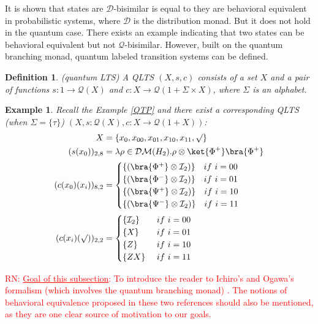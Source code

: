 \documentclass[a4paper, 11pt]{article}
\newtheorem{definition}{Definition}
\newtheorem{example}{Example}
\newcommand{\nevComment}[1]{\textcolor{red}{RN: #1}}
\begin{document}
It is shown that states are $\mathcal{D}$-bisimilar is equal to they are behavioral equivalent in probabilistic systems, where $\mathcal{D}$ is the distribution monad. But it does not hold in the quantum case. There exists an example indicating that two states can be behavioral equivalent but not $\mathcal{Q}$-bisimilar. However, built on the quantum branching monad, quantum labeled transition systems can be defined.  

\begin{definition}(quantum LTS) A QLTS $(X,s,c)$ consists of a set $X$ and a pair of functions $s:1\rightarrow \mathcal{Q}(X)$ and $c:X\rightarrow\mathcal{Q}(1+\Sigma\times X)$, where $\Sigma$ is an alphabet. 
\end{definition}

\begin{example}
Recall the Example \ref{QTP} and there exist a corresponding QLTS (when $\Sigma=\{\tau\}$) $(X,s:\mathcal{Q}(X),c:X\rightarrow \mathcal{Q}(1+X))$:
$$
\begin{aligned}
X&=\{x_0,x_{00},x_{01},x_{10},x_{11},\surd\}\\
(s(x_0))_{2,8}&=\lambda\rho\in\mathcal{DM}(H_2).\rho\otimes\ket{\Phi^+}\bra{\Phi^+}\\
(c(x_0)(x_i))_{8,2}&=
\begin{cases}
\{(\bra{\Phi^+}\otimes\mathcal{I}_2)\}\ \ \ if\ i=00\\ 
\{(\bra{\Phi^-}\otimes\mathcal{I}_2)\}\ \ \ if\ i=01\\ 
\{(\bra{\Psi^+}\otimes\mathcal{I}_2)\}\ \ \ if\ i=10\\ 
\{(\bra{\Psi^-}\otimes\mathcal{I}_2)\}\ \ \ if\ i=11
\end{cases}\\
(c(x_i)(\surd))_{2,2}&=
\begin{cases}
\{\mathcal{I}_2\}\ &if\ i=00\\
\{X\}\ &if\ i=01\\
\{Z\}\ &if\ i=10\\
\{ZX\}\ &if\ i=11
\end{cases}
\end{aligned}
$$
\end{example}

\nevComment{\underline{Goal of this subsection}: To introduce the
reader to Ichiro's and Ogawa's formalism (which involves the quantum
branching monad) \cite{hasuo17,ogawa14}. The notions of behavioral
equivalence proposed in these two references should also be mentioned, as they are one
clear source of motivation to our goals.}
\end{document}
